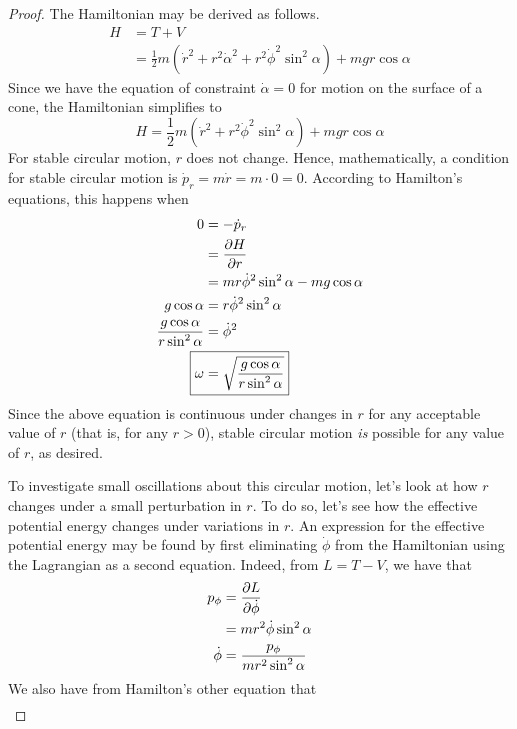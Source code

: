 \documentclass[../psets.tex]{subfiles}
\begin{document}
\begin{enumerate}
\begin{proof}
        The Hamiltonian may be derived as follows.
        \begin{align*}
            H &= T+V\\
            &= \frac{1}{2}m(\dot{r}^2+r^2\dot{\alpha}^2+r^2\dot{\phi}^2\sin^2\alpha)+mgr\cos\alpha
        \end{align*}
        Since we have the equation of constraint $\dot{\alpha}=0$ for motion on the surface of a cone, the Hamiltonian simplifies to
        \begin{equation*}
            \boxed{H = \frac{1}{2}m(\dot{r}^2+r^2\dot{\phi}^2\sin^2\alpha)+mgr\cos\alpha}
        \end{equation*}
        For stable circular motion, $r$ does not change. Hence, mathematically, a condition for stable circular motion is $\dot{p}_r=m\dot{r}=m\cdot 0=0$. According to Hamilton's equations, this happens when
        \begin{align*}
            0 &= -\dot{p}_r\\
            &= \pdv{H}{r}\\
            &= mr\dot{\phi}^2\sin^2\alpha-mg\cos\alpha\\
            g\cos\alpha &= r\dot{\phi}^2\sin^2\alpha\\
            \frac{g\cos\alpha}{r\sin^2\alpha} &= \dot{\phi}^2\\
            \Aboxed{\omega &= \sqrt{\frac{g\cos\alpha}{r\sin^2\alpha}}}
        \end{align*}
        Since the above equation is continuous under changes in $r$ for any acceptable value of $r$ (that is, for any $r>0$), stable circular motion \emph{is} possible for any value of $r$, as desired.\par
        To investigate small oscillations about this circular motion, let's look at how $r$ changes under a small perturbation in $r$. To do so, let's see how the effective potential energy changes under variations in $r$. An expression for the effective potential energy may be found by first eliminating $\dot{\phi}$ from the Hamiltonian using the Lagrangian as a second equation. Indeed, from $L=T-V$, we have that
        \begin{align*}
            p_\phi &= \pdv{L}{\dot{\phi}}\\
            &= mr^2\dot{\phi}\sin^2\alpha\\
            \dot{\phi} &= \frac{p_\phi}{mr^2\sin^2\alpha}
        \end{align*}
        We also have from Hamilton's other equation that
        \begin{align*}

\end{align*}
\end{proof}
\end{enumerate}
\end{document}

